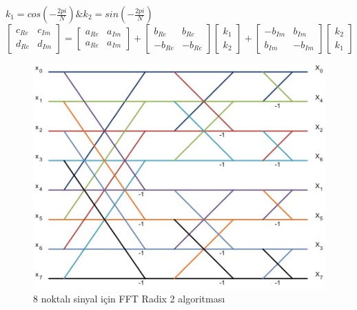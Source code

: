 $k_{1} = cos(-\frac{2pi}{N}) \& k_{2} = sin(-\frac{2pi}{N})$
\begin{equation} \label{equation:fft_radix2_butterfly}
  \begin{bmatrix}
    c_{Re} & c_{Im} \\[0.3em]
    d_{Re} & d_{Im} 
  \end{bmatrix} 
  = 
  \begin{bmatrix}
    a_{Re} & a_{Im} \\[0.3em]
    a_{Re} & a_{Im} 
  \end{bmatrix}
  +
  \begin{bmatrix}
    b_{Re} & b_{Re} \\[0.3em]
    -b_{Re} & -b_{Re} 
  \end{bmatrix}
  \begin{bmatrix}
    k_{1} \\[0.3em]
    k_{2} 
  \end{bmatrix}
  +
  \begin{bmatrix}
    -b_{Im} & b_{Im} \\[0.3em]
    b_{Im} & -b_{Im} 
  \end{bmatrix}
  \begin{bmatrix}
    k_{2} \\[0.3em]
    k_{1} 
  \end{bmatrix}
\end{equation} 

\begin{figure}[h] \label{image:fft_radix2_8p}
\centering \includegraphics{gorsel/fft_radix2_8p.jpg} \caption{8 noktalı sinyal için FFT Radix 2 algoritması}  
\end{figure}

